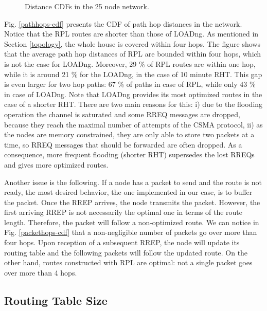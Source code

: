 \documentclass[conference,10pt,a4paper]{IEEEtran}
\begin{document}
\begin{figure}[htbp]
\centering
{}
\caption{Distance CDFs in the 25 node network.}
\end{figure}

Fig. \ref{pathhops-cdf} presents the CDF of path hop distances in the network. 
Notice that the RPL routes are shorter than those of LOADng. As mentioned
in Section \ref{topology}, the whole house is covered within four hops. The
figure shows that the average path hop distances of RPL are bounded within four
hops, which is not the case for LOADng. Moreover, 29 \% of RPL routes are within
one hop, while it is around 21 \% for the LOADng, in the case of 10
minute RHT. This gap is even larger for two hop paths: 67 \% of paths in
case of RPL, while only 43 \% in case of LOADng. Note that LOADng provides its
most optimized routes in the case of a shorter RHT. There are two
main reasons for this: i) due to the flooding operation the channel is saturated
and some RREQ messages are dropped, because they reach the maximal number of
attempts of the CSMA protocol, ii) as the nodes are memory constrained, they are
only able to store two packets at a time, so RREQ messages that should be
forwarded are often dropped. As a consequence, more frequent flooding (shorter
RHT) supersedes the lost RREQs and gives more optimized
routes. 

Another issue is the following. If a node has a
packet to send and the route is not ready, the most desired behavior, the
one implemented in our case, is to buffer the packet. Once the RREP arrives, the
node transmits the packet. However, the first arriving RREP is not
necessarily the optimal one in terms of the route length. Therefore, the
packet will follow a non-optimized route. 
We can notice in Fig. \ref{packethops-cdf} that a non-negligible number of
packets go over more than four hops. Upon reception of a subsequent RREP, the
node will 
update its routing table and the following packets will follow the updated
route. On the other hand, routes constructed with RPL are optimal: not a single packet
goes over more than 4 hops.

\vspace{-0.2cm}
\subsection{Routing Table Size}
\label{routingtable-size}
\end{document}
